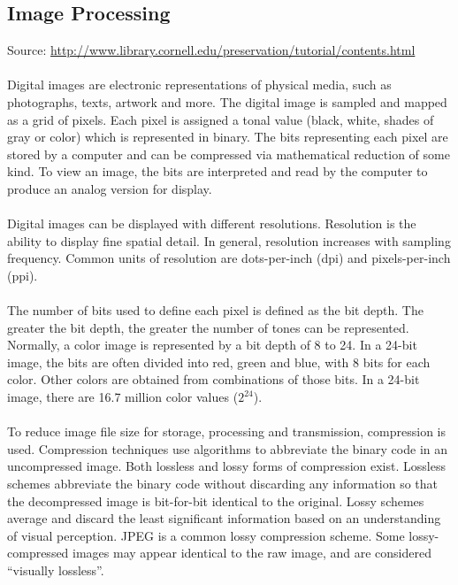 \documentclass{article}
\begin{document}
		\subsection*{Image Processing}
Source: {\color{red} \url{http://www.library.cornell.edu/preservation/tutorial/contents.html}} \\ \\
Digital images are electronic representations of physical media, such as photographs, texts, artwork and more.  The digital image is sampled and mapped as a grid of pixels.  Each pixel is assigned a tonal value (black, white, shades of gray or color) which is represented in binary.  The bits representing each pixel are stored by a computer and can be compressed via mathematical reduction of some kind.  To view an image, the bits are interpreted and read by the computer to produce an analog version for display. \\ \\

\noindent Digital images can be displayed with different resolutions.  Resolution is the ability to display fine spatial detail.  In general, resolution increases with sampling frequency.  Common units of resolution are dots-per-inch (dpi) and pixels-per-inch (ppi).   \\ \\

\noindent The number of bits used to define each pixel is defined as the bit depth.  The greater the bit depth, the greater the number of tones can be represented.  Normally, a color image is represented by a bit depth of 8 to 24.  In a 24-bit image, the bits are often divided into red, green and blue, with 8 bits for each color.  Other colors are obtained from combinations of those bits.  In a 24-bit image, there are 16.7 million color values ($2^{24}$).  	\\ \\

\noindent To reduce image file size for storage, processing and transmission, compression is used.  Compression techniques use algorithms to abbreviate the binary code in an uncompressed image.  Both lossless and lossy forms of compression exist. Lossless schemes abbreviate the binary code without discarding any information so that the decompressed image is bit-for-bit identical to the original.  Lossy schemes average and discard the least significant information based on an understanding of visual perception.  JPEG is a common lossy compression scheme.  Some lossy-compressed images may appear identical to the raw image, and are considered ``visually lossless''.  
\end{document}
